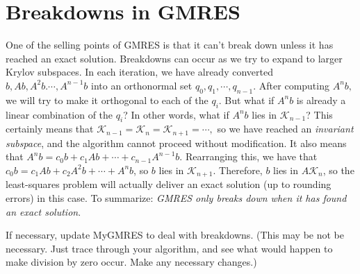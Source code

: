 \section*{Breakdowns in GMRES}
One of the selling points of GMRES is that it can't break down unless it has reached an exact solution.
Breakdowns can occur as we try to expand to larger Krylov subspaces.
In each iteration, we have already converted $b,Ab,A^2b.\cdots, A^{n-1}b$ into an orthonormal set $q_0,q_1,\cdots,q_{n-1}$.
After computing $A^nb,$ we will try to make it orthogonal to each of the $q_i$.
But what if $A^nb$ is already a linear combination of the $q_i$? In other words, what if $A^nb$ lies in $\mathcal{K}_{n-1}$?
This certainly means that $\mathcal{K}_{n-1}=\mathcal{K}_n=\mathcal{K}_{n+1}=\cdots,$ so we have reached an \textit{invariant subspace}, and the algorithm cannot proceed without modification.
It also means that $A^nb=c_0b+c_1Ab+\cdots+c_{n-1}A^{n-1}b.$
Rearranging this, we have that $c_0b=c_1Ab+c_2A^2b+\cdots+A^{n}b$, so $b$ lies in $\mathcal{K}_{n+1}$.
Therefore, $b$ lies in $A\mathcal{K}_n$, so the least-squares problem will actually deliver an exact solution (up to rounding errors) in this case.
To summarize: \textit{GMRES only breaks down when it has found an exact solution}.

\begin{problem}
\label{prob:GMRES3}
If necessary, update MyGMRES to deal with breakdowns.
(This may be not be necessary.
Just trace through your algorithm, and see what would happen to make division by zero occur.
Make any necessary changes.)
\end{problem}

